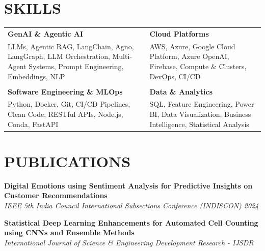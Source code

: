 \documentclass[a4paper,11pt]{article}
\newcommand{\safehref}[2]{#2}
\let\href\safehref
\newcommand{\extlink}{\raisebox{0.2ex}{\scriptsize\faExternalLink*}}
\begin{document}
\section*{SKILLS}
\setlength{\tabcolsep}{10pt}
\renewcommand{\arraystretch}{1.0}
\begin{tabularx}{\textwidth}{@{}>{\RaggedRight\arraybackslash}X >{\RaggedRight\arraybackslash}X@{}}
  \textbf{GenAI \& Agentic AI} & \textbf{Cloud Platforms} \\
  LLMs, Agentic RAG, LangChain, Agno, LangGraph, LLM Orchestration, Multi-Agent Systems, Prompt Engineering, Embeddings, NLP &
  AWS, Azure, Google Cloud Platform, Azure OpenAI, Firebase, Compute \& Clusters, DevOps, CI/CD \\
  \\[-3pt]
  \textbf{Software Engineering \& MLOps} & \textbf{Data \& Analytics} \\
  Python, Docker, Git, CI/CD Pipelines, Clean Code, RESTful APIs, Node.js, Conda, FastAPI &
  SQL, Feature Engineering, Power BI, Data Visualization, Business Intelligence, Statistical Analysis \\
\end{tabularx}

\section*{PUBLICATIONS}
\sloppy
\noindent\textbf{\href{https://example.com}{Digital Emotions using Sentiment Analysis for Predictive Insights on Customer Recommendations\ \extlink}}\\
\textit{IEEE 5th India Council International Subsections Conference (INDISCON) 2024}

\vspace{0.2cm}
\noindent\textbf{\href{https://example.com}{Statistical Deep Learning Enhancements for Automated Cell Counting using CNNs and Ensemble Methods\ \extlink}}\\
\textit{International Journal of Science \& Engineering Development Research - IJSDR}
\fussy

\end{document}
